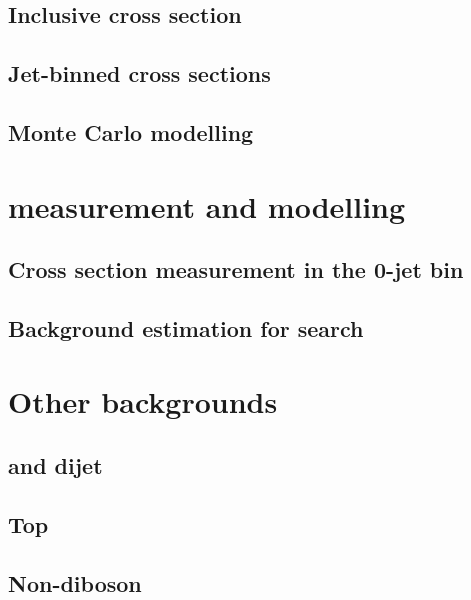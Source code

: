 \documentclass[hyper,linkcolor=blue]{mythesis}
\begin{document}
\begin{mainmatter}
    \section{Inclusive cross section}
      \label{sec:ggf_inc}
      
    \section{Jet-binned cross sections}
      \label{sec:ggf_jetbin}
      
    \section{Monte Carlo modelling}
      \label{sec:ggf_mc}
      

  \chapter{\WW measurement and modelling}
    \label{chap:ww}
    
    \section{Cross section measurement in the 0-jet bin}
      \label{sec:ww_meas}
      
    \section{Background estimation for \HWW search}
      \label{sec:ww_as_bkg}
      

  \chapter{Other backgrounds}
    \label{chap:backgrounds}
    
    \section{\Wjets and dijet}
      \label{sec:wjets}
      
    \section{Top}
      \label{sec:top}
      
    \section{\DY}
      \label{sec:dy}
      
    \section{Non-\WW diboson}
      \label{sec:diboson}
      


\end{mainmatter}
\end{document}
